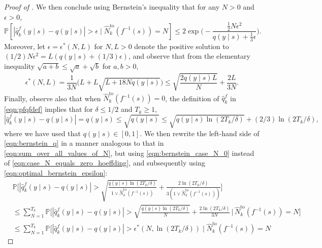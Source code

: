 \documentclass[10pt,a4paper]{amsart}
\newcommand{\bkt}[1]{\left[#1\right]}
\newcommand{\mbbP}{\mathbb{P}}
\begin{document}
\begin{proof}[Proof of ]
	We then conclude using Bernstein's inequality that for any $N>0$ and $\epsilon>0$,
	\begin{equation}
		\label{eqn:basic_bernstein}
		\mbbP\bkt{
		| \hat{q}^f_k(y\mid s)-q(y\mid s)| > \epsilon
		\mid
		\hat{N}^{\mathrm{to}}_k(f^{-1}(s))=N
		}
		\leq
		2\exp\biggl(
		-
		\frac{\frac{1}{2}N\epsilon^2}{q(y\mid s)+\frac{1}{3}\epsilon}
		\biggr)
		.
	\end{equation}
	Moreover, let $\epsilon=\epsilon^*(N,L)$ for $N,L>0$ denote the positive solution to $(1/2)N\epsilon^2=L(q(y\mid s)+(1/3)\epsilon)$, and observe that from the elementary inequality $\sqrt{a+b}\leq \sqrt{a}+\sqrt{b}$ for $a,b>0$,
	\begin{equation}
		\label{eqn:optimal_bernstein_epsilon}
		\epsilon^*(N,L)
		=
		\frac{1}{3N}
		\bigl(L + L\sqrt{L+18Nq(y\mid s)}\bigr)
		\leq
		\sqrt{\frac{2q(y\mid s)L}{N}} + \frac{2L}{3N}
		.
	\end{equation}
	Finally, observe also that when $\hat{N}^{\mathrm{to}}_k(f^{-1}(s))=0$, the definition of $\hat{q}_k^f$ in \eqref{eqn:pfqfdef} implies that for $\delta\leq 1/2$ and $T_k\geq 1$,
	\begin{equation}
		\label{eqn:bernstein_case_N_0}
		|\hat{q}_k^f(y\mid s)-q(y\mid s)|
		=
		q(y\mid s)
		\leq
		\sqrt{q(y\mid s)}
		\leq
		\sqrt{q(y\mid s)\ln(2T_k/\delta)}+(2/3)\ln(2T_k/\delta)
		,
	\end{equation}
	where we have used that $q(y\mid s)\in[0,1]$.
	We then rewrite the left-hand side of \eqref{eqn:bernstein_q} in a manner analogous to that in \eqref{eqn:sum_over_all_values_of_N}, but using \eqref{eqn:bernstein_case_N_0} instead of \eqref{eqn:case_N_equals_zero_hoeffding}, and subsequently using \eqref{eqn:optimal_bernstein_epsilon}:
	\begin{equation}
		\begin{split}
			 &
			\mbbP\biggl[
			| \hat{q}^f_k(y\mid s)-q(y\mid s) | >
			\sqrt{\frac{q(y\mid s) \ln(2T_k/\delta)}{1\vee\hat{N}^{\mathrm{to}}_k(f^{-1}(s))}}
			+
			\frac{2\ln(2T_k/\delta)}{3(1\vee\hat{N}^{\mathrm{to}}_k(f^{-1}(s)))}
			\biggr]
			\\
			 &
			\leq
			\sum_{N=1}^{T_k}
			\mbbP\biggl[
			|\hat{q}^f_k(y\mid s)-q(y\mid s)|>
			\sqrt{\frac{q(y\mid s) \ln(2T_k/\delta)}{N}}
			+
			\frac{2\ln(2T_k/\delta)}{3N}
			\,\bigg|\,
			\hat{N}^{\mathrm{to}}_k(f^{-1}(s)) = N
			\biggr]
			\\
			 &
			\leq
			\sum_{N=1}^{T_k}
			\mbbP\bigl[
			|\hat{q}^f_k(y\mid s)-q(y\mid s)|>
			\epsilon^*(N,\ln(2T_k/\delta))
			\mid
			\hat{N}^{\mathrm{to}}_k(f^{-1}(s)) = N

\end{split}
\end{equation}
\end{proof}
\end{document}
